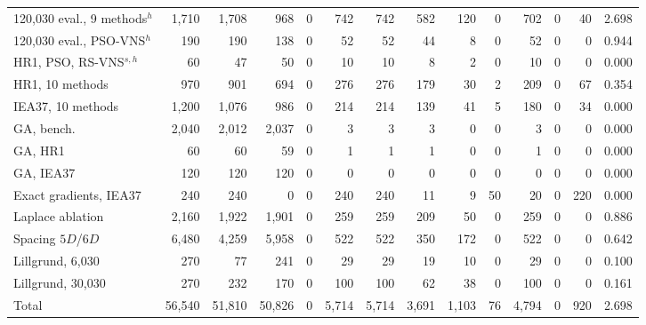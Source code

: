 \begin{table}[!htbp]
\begin{tabular}{lrrrrrrrrrrrrr}
120,030 eval., 9 methods$^h$ & 1,710 & 1,708 & 968 & 0 & 742 & 742 & 582 & 120 & 0 & 702 & 0 & 40 & 2.698 \\
120,030 eval., PSO-VNS$^h$ & 190 & 190 & 138 & 0 & 52 & 52 & 44 & 8 & 0 & 52 & 0 & 0 & 0.944 \\
HR1, PSO, RS-VNS$^{s,h}$ & 60 & 47 & 50 & 0 & 10 & 10 & 8 & 2 & 0 & 10 & 0 & 0 & 0.000 \\
HR1, 10 methods & 970 & 901 & 694 & 0 & 276 & 276 & 179 & 30 & 2 & 209 & 0 & 67 & 0.354 \\
IEA37, 10 methods & 1,200 & 1,076 & 986 & 0 & 214 & 214 & 139 & 41 & 5 & 180 & 0 & 34 & 0.000 \\
GA, bench. & 2,040 & 2,012 & 2,037 & 0 & 3 & 3 & 3 & 0 & 0 & 3 & 0 & 0 & 0.000 \\
GA, HR1 & 60 & 60 & 59 & 0 & 1 & 1 & 1 & 0 & 0 & 1 & 0 & 0 & 0.000 \\
GA, IEA37 & 120 & 120 & 120 & 0 & 0 & 0 & 0 & 0 & 0 & 0 & 0 & 0 & 0.000 \\
Exact gradients, IEA37 & 240 & 240 & 0 & 0 & 240 & 240 & 11 & 9 & 50 & 20 & 0 & 220 & 0.000 \\
Laplace ablation & 2,160 & 1,922 & 1,901 & 0 & 259 & 259 & 209 & 50 & 0 & 259 & 0 & 0 & 0.886 \\
Spacing $5D$/$6D$ & 6,480 & 4,259 & 5,958 & 0 & 522 & 522 & 350 & 172 & 0 & 522 & 0 & 0 & 0.642 \\
Lillgrund, 6,030 & 270 & 77 & 241 & 0 & 29 & 29 & 19 & 10 & 0 & 29 & 0 & 0 & 0.100 \\
Lillgrund, 30,030 & 270 & 232 & 170 & 0 & 100 & 100 & 62 & 38 & 0 & 100 & 0 & 0 & 0.161 \\
\midrule
Total & 56,540 & 51,810 & 50,826 & 0 & 5,714 & 5,714 & 3,691 & 1,103 & 76 & 4,794 & 0 & 920 & 2.698 \\
\bottomrule
\end{tabular}
\end{table}
